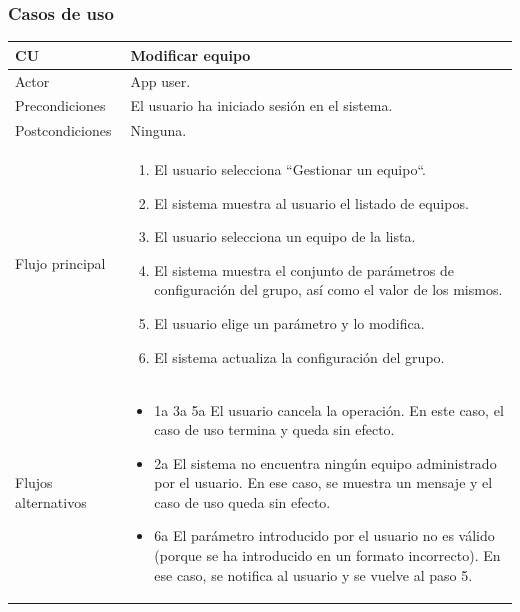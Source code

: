 \documentclass[twoside]{report}
\newcommand\addrow[2]{#1 &#2\\ }
\newcommand\addheading[2]{#1 &#2\\ \hline}
\newcommand\tabularhead{\begin{tabular}{lp{0.7\textwidth}}
\hline
}
\newenvironment{usecase}{\tabularhead}
{\hline\end{tabular}}
\begin{document}
\subsubsection{Casos de uso}



\begin{usecase}
  \addheading{\textbf{CU\arabic{usecase}}}{Modificar equipo} 
  \addrow{Actor}{App user.}
  \addrow{Precondiciones}{El usuario ha iniciado sesión en el sistema.}
  \addrow{Postcondiciones}{Ninguna.}
  \addrow{Flujo principal}{
  		\begin{enumerate}
  		\item El usuario selecciona “Gestionar un equipo“. %
        \item El sistema muestra al usuario el listado de equipos. %
        \item El usuario selecciona un equipo de la lista. %
        \item El sistema muestra el conjunto de parámetros de configuración del grupo, así como el valor de los mismos. %
        \item El usuario elige un parámetro y lo modifica. %
        \item El sistema actualiza la configuración del grupo. %
  		\end{enumerate}
  }
  \addrow{Flujos alternativos}{
  		\begin{itemize}
  		\item 1a 3a 5a El usuario cancela la operación. En este caso, el caso de uso termina y queda sin efecto.
  		\item 2a El sistema no encuentra ningún equipo administrado por el usuario. En ese caso, se muestra un mensaje y el caso de uso queda sin efecto.
  		\item 6a El parámetro introducido por el usuario no es válido (porque se ha introducido en un formato incorrecto). En ese caso, se notifica al usuario y se vuelve al paso 5.
  		\end{itemize}
  }
\end{usecase}\\

\vspace{0.5cm}
\end{document}
